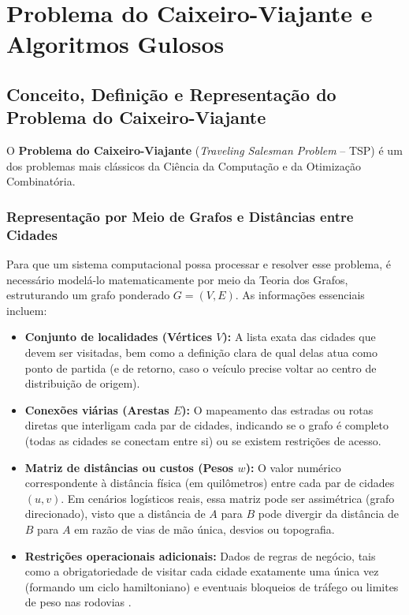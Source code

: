
\chapter{Problema do Caixeiro-Viajante e Algoritmos Gulosos}

\section{Conceito, Definição e Representação do Problema do Caixeiro-Viajante}

O \textbf{Problema do Caixeiro-Viajante} (\textit{Traveling Salesman Problem} -- TSP) é um dos problemas mais clássicos da Ciência da Computação e da Otimização Combinatória.

\subsection{Representação por Meio de Grafos e Distâncias entre Cidades}

Para que um sistema computacional possa processar e resolver esse problema, é necessário modelá-lo matematicamente por meio da Teoria dos Grafos, estruturando um grafo ponderado $G = (V, E)$. As informações essenciais incluem:

\begin{itemize}
    \item \textbf{Conjunto de localidades (Vértices $V$):} A lista exata das cidades que devem ser visitadas, bem como a definição clara de qual delas atua como ponto de partida (e de retorno, caso o veículo precise voltar ao centro de distribuição de origem).
    \item \textbf{Conexões viárias (Arestas $E$):} O mapeamento das estradas ou rotas diretas que interligam cada par de cidades, indicando se o grafo é completo (todas as cidades se conectam entre si) ou se existem restrições de acesso.
    \item \textbf{Matriz de distâncias ou custos (Pesos $w$):} O valor numérico correspondente à distância física (em quilômetros) entre cada par de cidades $(u, v)$. Em cenários logísticos reais, essa matriz pode ser assimétrica (grafo direcionado), visto que a distância de $A$ para $B$ pode divergir da distância de $B$ para $A$ em razão de vias de mão única, desvios ou topografia.
    \item \textbf{Restrições operacionais adicionais:} Dados de regras de negócio, tais como a obrigatoriedade de visitar cada cidade exatamente uma única vez (formando um ciclo hamiltoniano) e eventuais bloqueios de tráfego ou limites de peso nas rodovias \cite{feofiloff2011, barbosa2022}.
\end{itemize}

